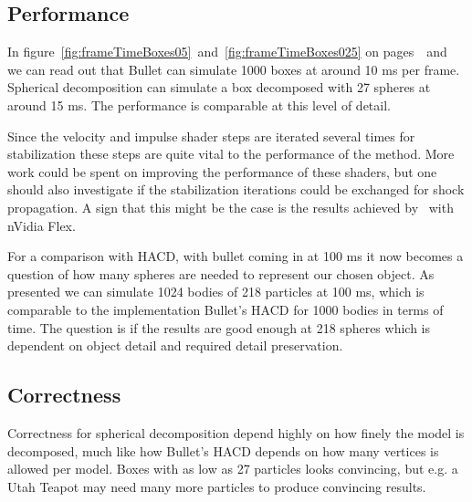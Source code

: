 \subsection{Performance}
In figure~\ref{fig:frameTimeBoxes05}~and~\ref{fig:frameTimeBoxes025}
on pages~\pageref{fig:frameTimeBoxes05}~and~\pageref{fig:frameTimeBoxes025}
we can read out that Bullet can simulate 1000 boxes at around 10 ms per frame.
Spherical decomposition can simulate a box decomposed with 27 spheres at around 15 ms.
The performance is comparable at this level of detail.

Since the velocity and impulse shader steps are iterated
several times for stabilization these steps are quite vital to the performance
of the method. More work could be spent on improving the performance of these shaders,
but one should also investigate if the stabilization iterations could be exchanged for
shock propagation. A sign that this might be the case is the results achieved by~\cite{flex} with nVidia Flex.

For a comparison with HACD, with bullet coming in at 100 ms it now becomes
a question of how many spheres are needed to represent our chosen object.
As presented we can simulate 1024 bodies of 218 particles at 100 ms, which is comparable to
 the implementation Bullet's HACD for 1000 bodies in terms of time. The question is
 if the results are good enough at 218 spheres which is dependent on object detail
 and required detail preservation.

\subsection{Correctness}
Correctness for spherical decomposition depend highly on how finely the model is
decomposed, much like how Bullet's HACD depends on how many vertices is allowed
per model. Boxes with as low as 27 particles looks convincing, but e.g. a Utah Teapot
may need many more particles to produce convincing results.
